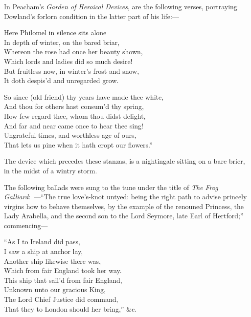 In Peacham’s \textit{Garden of Heroical Devices}, are the following verses, portraying
Dowland’s forlorn condition in the latter part of his life:—
\settowidth{\versewidth}{So since (old friend) thy years have made thee white,}
\begin{scverse}\begin{patverse}
Here Philomel in silence sits alone\\
In depth of winter, on the bared briar,\\
Whereon the rose had once her beauty shown,\\
Which lords and ladies did so much desire!\\
But fruitless now, in winter’s frost and snow,\\
It doth despis’d and unregarded grow.
\end{patverse}

\begin{patverse}
So since (old friend) thy years have made thee white,\\
And thou for others hast consum’d thy spring,\\
How few regard thee, whom thou didst delight,\\
And far and near came once to hear thee sing!\\
Ungrateful times, and worthless age of ours,\\
That lets us pine when it hath cropt our flowers.”
\end{patverse}
\end{scverse}

The device which precedes these stanzas, is a nightingale sitting on a bare
brier, in the midst of a wintry storm.

The following ballads were sung to the tune under the title of \textit{The Frog
Galliard}:\ —“The true love’s-knot untyed: being the right path to advise princely
virgins how to behave themselves, by the example of the renouned Princess, the
Lady Arabella, and the second son to the Lord Seymore, late Earl of Hertford;”
commencing—
\begin{scverse}\begin{altverse}
“As I to Ireland did pass,\\
I saw a ship at anchor lay,\\
Another ship likewise there was,\\
Which from fair England took her way.\\
This ship that sail’d from fair England,\\
Unknown unto our gracious King,\\
The Lord Chief Justice did command,\\
That they to London should her bring,” \&c.
\end{altverse}
\end{scverse}
\pagebreak

